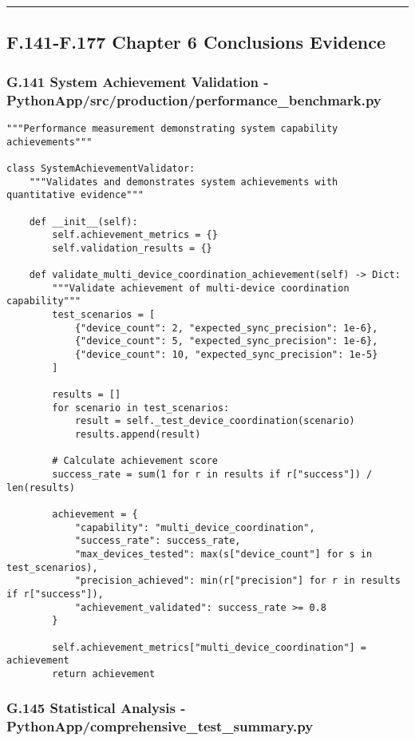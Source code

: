 \documentclass[12pt,a4paper]{article}
\begin{document}
{{\hrule

\subsection{F.141-F.177 Chapter 6 Conclusions Evidence}

\subsubsection{G.141 System Achievement Validation - PythonApp/src/production/performance_benchmark.py}

\begin{verbatim}
"""Performance measurement demonstrating system capability achievements"""

class SystemAchievementValidator:
    """Validates and demonstrates system achievements with quantitative evidence"""
    
    def __init__(self):
        self.achievement_metrics = {}
        self.validation_results = {}
        
    def validate_multi_device_coordination_achievement(self) -> Dict:
        """Validate achievement of multi-device coordination capability"""
        test_scenarios = [
            {"device_count": 2, "expected_sync_precision": 1e-6},
            {"device_count": 5, "expected_sync_precision": 1e-6},
            {"device_count": 10, "expected_sync_precision": 1e-5}
        ]
        
        results = []
        for scenario in test_scenarios:
            result = self._test_device_coordination(scenario)
            results.append(result)
        
        # Calculate achievement score
        success_rate = sum(1 for r in results if r["success"]) / len(results)
        
        achievement = {
            "capability": "multi_device_coordination",
            "success_rate": success_rate,
            "max_devices_tested": max(s["device_count"] for s in test_scenarios),
            "precision_achieved": min(r["precision"] for r in results if r["success"]),
            "achievement_validated": success_rate >= 0.8
        }
        
        self.achievement_metrics["multi_device_coordination"] = achievement
        return achievement
\end{verbatim}

\subsubsection{G.145 Statistical Analysis - PythonApp/comprehensive_test_summary.py}

}}
\end{document}
